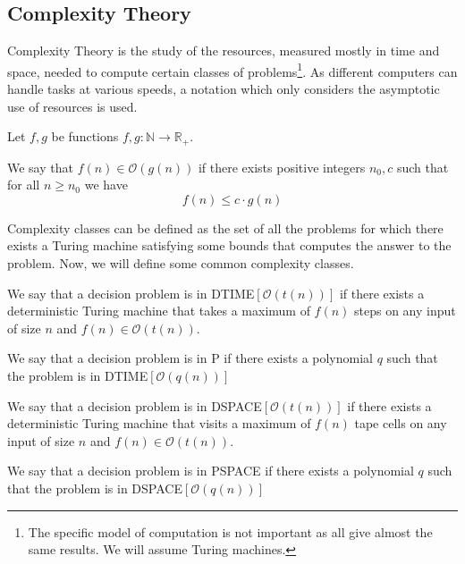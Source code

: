 \subsection{Complexity Theory}\label{subsec:complexity-theory}

Complexity Theory is the study of the resources, measured mostly in time and space, needed to compute certain classes of problems\footnote{The specific model of computation is not important as all give almost the same results. We will assume Turing machines.}.
As different computers can handle tasks at various speeds, a notation which only considers the asymptotic use of resources is used.

\begin{define}
    Let $f, g$ be functions $f, g: \mathbb{N} \to \mathbb{R}_+$.

    We say that $f(n) \in \mathcal{O}(g(n))$ if there exists positive integers $n_0, c$ such that for all $n \geq n_0$ we have \[f(n) \leq c\cdot g(n)\]
\end{define}

Complexity classes can be defined as the set of all the problems for which there exists a Turing machine satisfying some bounds that computes the answer to the problem.
Now, we will define some common complexity classes.

\begin{define}
[{DTIME$[\mathcal{O}(t(n))]$}]
    We say that a decision problem is in DTIME$[\mathcal{O}(t(n))]$ if there exists a deterministic Turing machine that takes a maximum of $f(n)$ steps on any input of size $n$ and $f(n) \in \mathcal{O}(t(n))$.
\end{define}

\begin{define}[P]
    We say that a decision problem is in P if there exists a polynomial $q$ such that the problem is in DTIME$[\mathcal{O}(q(n))]$
\end{define}

\begin{define}
[{DSPACE$[\mathcal{O}(t(n))]$}]
    We say that a decision problem is in DSPACE$[\mathcal{O}(t(n))]$ if there exists a deterministic Turing machine that visits a maximum of $f(n)$ tape cells on any input of size $n$ and $f(n) \in \mathcal{O}(t(n))$.
\end{define}

\begin{define}[PSPACE]
    We say that a decision problem is in PSPACE if there exists a polynomial $q$ such that the problem is in DSPACE$[\mathcal{O}(q(n))]$
\end{define}

